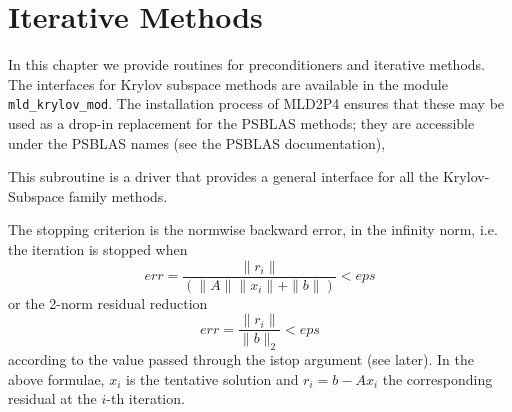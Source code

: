 \section{Iterative Methods}
\label{sec:methods}

In this chapter we provide routines for preconditioners and iterative
methods. The interfaces for Krylov subspace methods are available in
the module \verb|mld_krylov_mod|. The installation process of MLD2P4
ensures that these may be used as a drop-in replacement for the PSBLAS
methods; they are accessible under the PSBLAS names (see the PSBLAS
documentation), 

%
%


This subroutine is a driver that provides a general interface for all
the Krylov-Subspace family methods.

The stopping criterion is the normwise backward error, in the infinity
norm, i.e. the iteration is stopped when 
\[ err = \frac{\|r_i\|}{(\|A\|\|x_i\|+\|b\|)} < eps \]
or the 2-norm residual reduction
\[ err = \frac{\|r_i\|}{\|b\|_2} < eps \]
according to the value passed through the  istop argument (see
later). In the above formulae, $x_i$ is the tentative solution and
$r_i=b-Ax_i$ the corresponding residual at the $i$-th iteration. 



